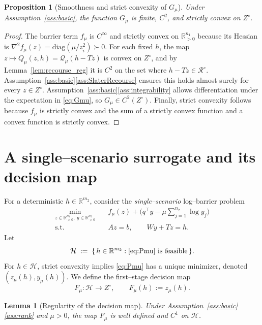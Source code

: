 \documentclass[11pt]{article}
\newcommand{\R}{\mathbb{R}}
\theoremstyle{plain}
\newtheorem{lemma}{Lemma}
\newtheorem{proposition}{Proposition}
\theoremstyle{definition}
\begin{document}
\begin{proposition}[Smoothness and strict convexity of $G_\mu$]\label{prop:Gmu}
Under Assumption~\ref{ass:basic}, the function $G_\mu$ is finite, $C^2$, and strictly convex on $Z^\circ$.
\end{proposition}

\begin{proof}
The barrier term $f_\mu$ is $C^\infty$ and strictly convex on $\R^{n_1}_{>0}$ because its Hessian is
$\nabla^2 f_\mu(z)=\mathrm{diag}(\mu/z_i^2)\succ 0$.
For each fixed $h$, the map $z\mapsto Q_\mu(z,h)=\mathcal{Q}_\mu(h-Tz)$ is convex on $Z^\circ$, and by
Lemma~\ref{lem:recourse_reg} it is $C^2$ on the set where $h-Tz\in\mathcal{R}^\circ$.
Assumption~\ref{ass:basic}\ref{ass:SlaterRecourse} ensures this holds almost surely for every $z\in Z^\circ$.
Assumption~\ref{ass:basic}\ref{ass:integrability} allows differentiation under the expectation in \eqref{eq:Gmu},
so $G_\mu\in C^2(Z^\circ)$. Finally, strict convexity follows because $f_\mu$ is strictly convex and the sum of a
strictly convex function and a convex function is strictly convex.
\end{proof}

\section{A single--scenario surrogate and its decision map}

For a deterministic $h\in\R^{m_2}$, consider the \emph{single--scenario} log--barrier problem
\begin{equation}\label{eq:Pmu}
\begin{aligned}
\min_{z\in\R^{n_1}_{>0},\ y\in\R^{n_2}_{>0}}\quad
& f_\mu(z) + \Big(q^\top y - \mu\sum_{j=1}^{n_2}\log y_j\Big) \\
\text{s.t.}\quad & Az=b,\qquad Wy + Tz = h.
\end{aligned}
\end{equation}
Let
\[
\mathcal{H}\;:=\;\{\, h\in\R^{m_2} : \text{\eqref{eq:Pmu} is feasible}\,\}.
\]
For $h\in\mathcal{H}$, strict convexity implies \eqref{eq:Pmu} has a unique minimizer, denoted
$(z_\mu(h),y_\mu(h))$. We define the first--stage decision map
\[
F_\mu:\mathcal{H}\to Z^\circ,\qquad F_\mu(h):=z_\mu(h).
\]

\begin{lemma}[Regularity of the decision map]\label{lem:Fmu_C1}
Under Assumption~\ref{ass:basic}\ref{ass:rank} and $\mu>0$, the map $F_\mu$ is well defined and $C^1$ on
$\mathcal{H}$.
\end{lemma}
\end{document}
